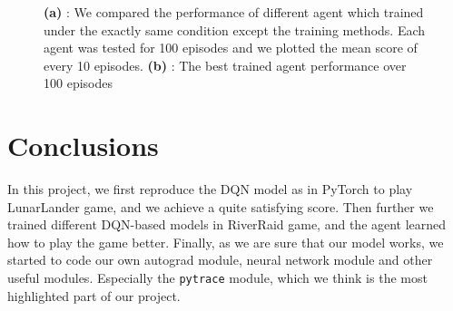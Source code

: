 \documentclass[12pt]{article}
\begin{document}
\begin{figure}[t]
\centering
{}%
%
\quad

\caption{\label{fig:diff-dqn}\textbf{(a)} : We compared the performance of different agent which trained under the exactly same condition except the training methods. Each agent was tested for 100 episodes and we plotted the mean score of every 10 episodes. \textbf{  (b)} : The best trained agent performance over 100 episodes}
\end{figure}

\section{Conclusions}
In this project, we first reproduce the DQN model as \cite{DBLP:journals/nature/MnihKSRVBGRFOPB15} in PyTorch to play LunarLander game, and we achieve a quite satisfying score. Then further we trained different DQN-based models in RiverRaid game, and the agent learned how to play the game better. Finally, as we are sure that our model works, we started to code our own autograd module, neural network module and other useful modules. Especially the \texttt{pytrace} module, which we think is the most highlighted part of our project.
\end{document}
